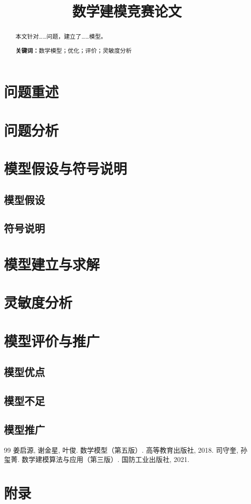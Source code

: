 \documentclass[12pt,a4paper]{article}
\begin{document}
\title{\textbf{\Huge 数学建模竞赛论文}}
\author{}
\date{}
\maketitle

\begin{abstract}
\noindent
本文针对\ldots\ldots 问题，建立了\ldots\ldots 模型。

\vspace{1em}
\noindent\textbf{关键词：}数学模型；优化；评价；灵敏度分析
\end{abstract}

\section{问题重述}

\section{问题分析}

\section{模型假设与符号说明}
\subsection{模型假设}
\subsection{符号说明}

\section{模型建立与求解}

\section{灵敏度分析}

\section{模型评价与推广}
\subsection{模型优点}
\subsection{模型不足}
\subsection{模型推广}

\begin{thebibliography}{99}
 姜启源, 谢金星, 叶俊. 数学模型（第五版）. 高等教育出版社, 2018.
 司守奎, 孙玺菁. 数学建模算法与应用（第三版）. 国防工业出版社, 2021.
\end{thebibliography}

\section*{附录}
\end{document}
